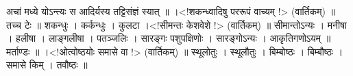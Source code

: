 अचां मध्ये योऽन्त्यः स आदिर्यस्य तट्टिसंज्ञं स्यात् ॥
।\textless{}!शकन्ध्वादिषु पररूपं वाच्यम् !\textgreater{} (वार्तिकम्) ॥
तच्च टेः ॥ शकन्धुः । कर्कन्धुः । कुलटा ।\textless{}!सीमन्तः केशवेशे
!\textgreater{} (वार्तिकम्) ॥ सीमान्तोऽन्यः । मनीषा । हलीषा । लाङ्गलीषा
। पतञ्जलिः । सारङ्गः पशुपक्षिणोः । सारङ्गोऽन्यः । आकृतिगणोऽयम् ॥
मर्ताण्डः ॥ ।\textless{}!ओत्वोष्ठयोः समासे वा !\textgreater{}
(वार्तिकम्) ॥ स्थूलोतुः । स्थूलौतुः । बिम्बोष्ठः । बिम्बौष्ठः । समासे
किम् । तवौष्ठः ॥
